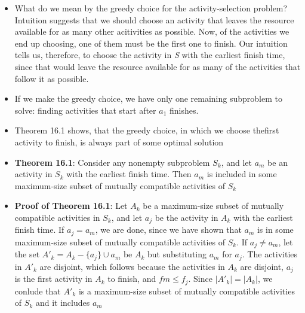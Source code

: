 \documentclass{report}
\begin{document}
\begin{itemize}
    \item What do we mean by the greedy choice for the activity-selection problem? Intuition suggests that we should choose an activity that leaves the resource available for as many other acitivities as possible. Now, of the activities we end up choosing, one of them must be the first one to finish. Our intuition tells us, therefore, to choose the activity in \textit{S} with the earliest finish time, since that would leave the resource available for as many of the activities that follow it as possible.
    \item If we make the greedy choice, we have only one remaining subproblem to solve: finding activities that start after $a_1$ finishes. 
    \item Theorem 16.1 shows, that the greedy choice, in which we choose thefirst activity to finish, is always part of some optimal solution \\
    \item \textbf{Theorem 16.1}: Consider any nonempty subproblem $S_k$, and let $a_m$ be an activity in $S_k$ with the earliest finish time. Then $a_m$ is included in some maximum-size subset of mutually compatible activities of $S_k$
    \item \textbf{Proof of Theorem 16.1}: Let $A_k$ be a maximum-size subset of mutually compatible activities in $S_k$, and let $a_j$ be the activity in $A_k$ with the earliest finish time. If $a_j = a_m$, we are done, since we have shown that $a_m$ is in some maximum-size subset of mutually compatible activities of $S_k$. If $a_j \neq a_m$, let the set $A'_k = A_k - \{a_j\} \cup {a_m}$ be $A_k$ but substituting $a_m$ for $a_j$. The activities in $A'_k$ are disjoint,  which follows because the activities in $A_k$ are disjoint, $a_j$ is the first activity in $A_k$ to finish, and $fm \leq f_j$. Since $|A'_k| = |A_k|$, we conlude that $A'_k$ is a maximum-size subset of mutually compatible activities of $S_k$ and it includes $a_m$
\end{itemize}
\end{document}
